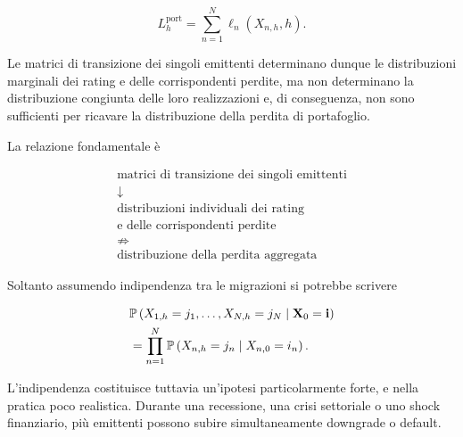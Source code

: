 \[
L_h^{\mathrm{port}}
=
\sum_{n=1}^{N}
\ell_n(X_{n,h},h).
\]

Le matrici di transizione dei singoli emittenti determinano dunque le
distribuzioni marginali dei rating e delle corrispondenti perdite, ma
non determinano la distribuzione congiunta delle loro realizzazioni e,
di conseguenza, non sono sufficienti per ricavare la distribuzione
della perdita di portafoglio.

La relazione fondamentale \`{e}

\[
\boxed{
\begin{array}{c}
\text{matrici di transizione dei singoli emittenti}
\\[1mm]
\downarrow
\\[1mm]
\text{distribuzioni individuali dei rating}
\\
\text{e delle corrispondenti perdite}
\\[3mm]
\not\Longrightarrow
\\[3mm]
\text{distribuzione della perdita aggregata}
\end{array}
}
\]


Soltanto assumendo indipendenza tra le migrazioni si potrebbe scrivere

\[
\begin{split}
&
\mathbb{P}
\left(
X_{1,h}=j_1,\ldots,X_{N,h}=j_N
\mid
\mathbf{X}_0=\mathbf{i}
\right)
\\
&=
\prod_{n=1}^{N}
\mathbb{P}
\left(
X_{n,h}=j_n
\mid
X_{n,0}=i_n
\right).
\end{split}
\]

L'indipendenza costituisce tuttavia un'ipotesi particolarmente forte, e nella pratica poco realistica.
Durante una recessione, una crisi settoriale o uno shock finanziario,
pi\`{u} emittenti possono subire simultaneamente downgrade o default.

